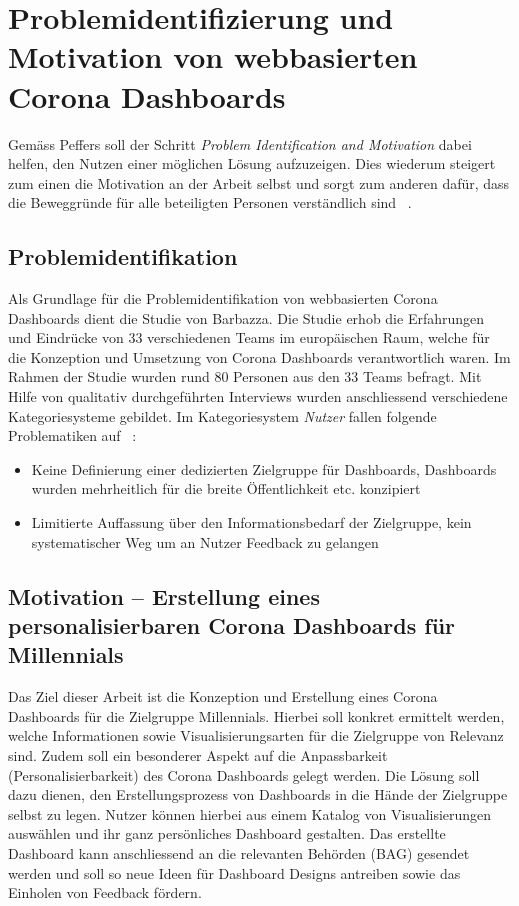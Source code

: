 \section{Problemidentifizierung und Motivation von webbasierten Corona Dashboards}
Gemäss Peffers soll der Schritt \textit{Problem Identification and Motivation} dabei helfen, den Nutzen einer möglichen Lösung aufzuzeigen. Dies wiederum steigert zum einen die Motivation an der Arbeit selbst und sorgt zum anderen dafür, dass die Beweggründe für alle beteiligten Personen verständlich sind ~\citep[S. 52 + 55]{peffers}.


\subsection{Problemidentifikation}
Als Grundlage für die Problemidentifikation von webbasierten Corona Dashboards dient die Studie von Barbazza. Die Studie erhob die Erfahrungen und Eindrücke von 33 verschiedenen Teams im europäischen Raum, welche für die Konzeption und Umsetzung von Corona Dashboards verantwortlich waren. Im Rahmen der Studie wurden rund 80 Personen aus den 33 Teams befragt. Mit Hilfe von qualitativ durchgeführten Interviews wurden anschliessend verschiedene Kategoriesysteme gebildet. Im Kategoriesystem \textit{Nutzer} fallen folgende Problematiken auf ~\citep[S. 14 + 15]{barbazza}:
\begin{itemize}
    \item Keine Definierung einer dedizierten Zielgruppe für Dashboards, Dashboards wurden mehrheitlich für die breite Öffentlichkeit etc. konzipiert
    \item Limitierte Auffassung über den Informationsbedarf der Zielgruppe, kein systematischer Weg um an Nutzer Feedback zu gelangen
\end{itemize}

\subsection{Motivation – Erstellung eines personalisierbaren Corona Dashboards für Millennials}
Das Ziel dieser Arbeit ist die Konzeption und Erstellung eines Corona Dashboards für die Zielgruppe Millennials. Hierbei soll konkret ermittelt werden, welche Informationen sowie Visualisierungsarten für die Zielgruppe von Relevanz sind. Zudem soll ein besonderer Aspekt auf die Anpassbarkeit (Personalisierbarkeit) des Corona Dashboards gelegt werden. Die Lösung soll dazu dienen, den Erstellungsprozess von Dashboards in die Hände der Zielgruppe selbst zu legen. Nutzer können hierbei aus einem Katalog von Visualisierungen auswählen und ihr ganz persönliches Dashboard gestalten. Das erstellte Dashboard kann anschliessend an die relevanten Behörden (BAG) gesendet werden und soll so neue Ideen für Dashboard Designs antreiben sowie das Einholen von Feedback fördern.